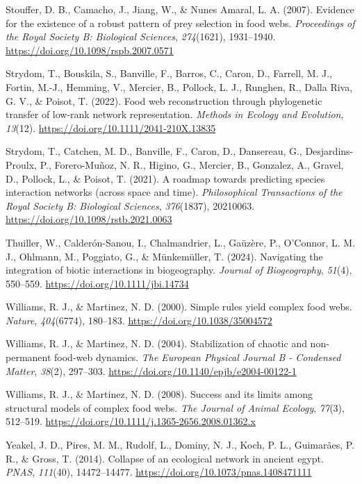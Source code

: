 \documentclass[
]{article}
\newlength{\cslhangindent}
\newenvironment{CSLReferences}[2] %
 {\begin{list}{}{%
  \setlength{\itemindent}{0pt}
  \setlength{\leftmargin}{0pt}
  \setlength{\parsep}{0pt}
  \ifodd #1
   \setlength{\leftmargin}{\cslhangindent}
   \setlength{\itemindent}{-1\cslhangindent}
  \fi
  \setlength{\itemsep}{#2\baselineskip}}}
 {\end{list}}
\begin{document}
\begin{CSLReferences}{1}{0}
Stouffer, D. B., Camacho, J., Jiang, W., \& Nunes Amaral, L. A. (2007).
Evidence for the existence of a robust pattern of prey selection in food
webs. \emph{Proceedings of the Royal Society B: Biological Sciences},
\emph{274}(1621), 1931--1940.
\url{https://doi.org/10.1098/rspb.2007.0571}

Strydom, T., Bouskila, S., Banville, F., Barros, C., Caron, D., Farrell,
M. J., Fortin, M.-J., Hemming, V., Mercier, B., Pollock, L. J., Runghen,
R., Dalla Riva, G. V., \& Poisot, T. (2022). Food web reconstruction
through phylogenetic transfer of low-rank network representation.
\emph{Methods in Ecology and Evolution}, \emph{13}(12).
\url{https://doi.org/10.1111/2041-210X.13835}

Strydom, T., Catchen, M. D., Banville, F., Caron, D., Dansereau, G.,
Desjardins-Proulx, P., Forero-Muñoz, N. R., Higino, G., Mercier, B.,
Gonzalez, A., Gravel, D., Pollock, L., \& Poisot, T. (2021). A roadmap
towards predicting species interaction networks (across space and time).
\emph{Philosophical Transactions of the Royal Society B: Biological
Sciences}, \emph{376}(1837), 20210063.
\url{https://doi.org/10.1098/rstb.2021.0063}

Thuiller, W., Calderón-Sanou, I., Chalmandrier, L., Gaüzère, P.,
O'Connor, L. M. J., Ohlmann, M., Poggiato, G., \& Münkemüller, T.
(2024). Navigating the integration of biotic interactions in
biogeography. \emph{Journal of Biogeography}, \emph{51}(4), 550--559.
\url{https://doi.org/10.1111/jbi.14734}

Williams, R. J., \& Martinez, N. D. (2000). Simple rules yield complex
food webs. \emph{Nature}, \emph{404}(6774), 180--183.
\url{https://doi.org/10.1038/35004572}

Williams, R. J., \& Martinez, N. D. (2004). Stabilization of chaotic and
non-permanent food-web dynamics. \emph{The European Physical Journal B -
Condensed Matter}, \emph{38}(2), 297--303.
\url{https://doi.org/10.1140/epjb/e2004-00122-1}

Williams, R. J., \& Martinez, N. D. (2008). Success and its limits among
structural models of complex food webs. \emph{The Journal of Animal
Ecology}, \emph{77}(3), 512--519.
\url{https://doi.org/10.1111/j.1365-2656.2008.01362.x}

Yeakel, J. D., Pires, M. M., Rudolf, L., Dominy, N. J., Koch, P. L.,
Guimarães, P. R., \& Gross, T. (2014). Collapse of an ecological network
in ancient egypt. \emph{PNAS}, \emph{111}(40), 14472--14477.
\url{https://doi.org/10.1073/pnas.1408471111}

\end{CSLReferences}
\end{document}
